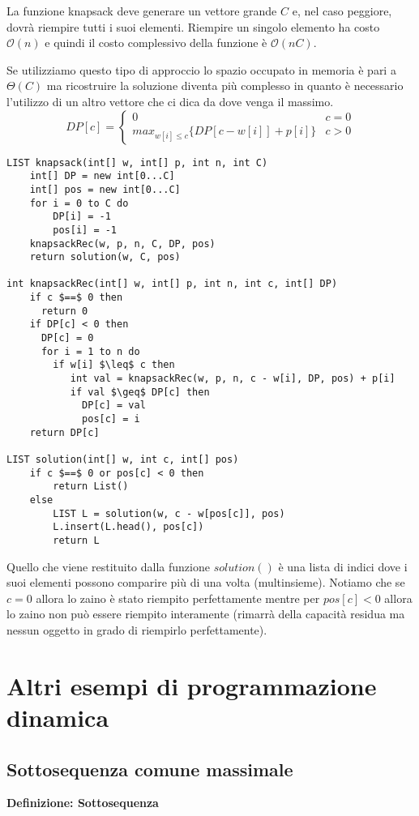 \documentclass[../cheatSheetAlgoritmi.tex]{subfiles}
\begin{document}
La funzione knapsack deve generare un vettore grande $C$ e, nel caso peggiore, dovrà riempire tutti i suoi elementi. Riempire un singolo elemento ha costo $\mathcal{O}(n)$ e quindi il costo complessivo della funzione è  $\mathcal{O}(nC)$.

\bigskip

Se utilizziamo questo tipo di approccio lo spazio occupato in memoria è pari a $\Theta(C)$ ma ricostruire la soluzione diventa più complesso in quanto è necessario l'utilizzo di un altro vettore che ci dica da dove venga il massimo.
\begin{equation*}
  	DP[c] =\begin{cases}
    	0 & \text{$c = 0$}\\
    	max_{w[i] \leq c}\{DP[c-w[i]]+p[i]\} & \text{$c>0$}
  	\end{cases}
\end{equation*}
\begin{lstlisting}[caption= Knapsack Ricostruzione Soluzione]
LIST knapsack(int[] w, int[] p, int n, int C)
	int[] DP = new int[0...C]
	int[] pos = new int[0...C]
	for i = 0 to C do
		DP[i] = -1
		pos[i] = -1
	knapsackRec(w, p, n, C, DP, pos)
	return solution(w, C, pos)
	
int knapsackRec(int[] w, int[] p, int n, int c, int[] DP)
	if c $==$ 0 then
	  return 0
	if DP[c] < 0 then
	  DP[c] = 0
	  for i = 1 to n do
	    if w[i] $\leq$ c then
	  	   int val = knapsackRec(w, p, n, c - w[i], DP, pos) + p[i]
	  	   if val $\geq$ DP[c] then
	   	     DP[c] = val
	   	     pos[c] = i
	return DP[c]
	
LIST solution(int[] w, int c, int[] pos)
	if c $==$ 0 or pos[c] < 0 then
		return List()
	else
		LIST L = solution(w, c - w[pos[c]], pos)
		L.insert(L.head(), pos[c])
		return L
\end{lstlisting}
Quello che viene restituito dalla funzione $solution()$ è una lista di indici dove i suoi elementi possono comparire più di una volta (multinsieme). Notiamo che se $c=0$ allora lo zaino è stato riempito perfettamente mentre per $pos[c]<0$ allora lo zaino non può essere riempito interamente (rimarrà della capacità residua ma nessun oggetto in grado di riempirlo perfettamente).
\newpage

\section{Altri esempi di programmazione dinamica} 
\subsection{Sottosequenza comune massimale}
\textbf{Definizione: Sottosequenza}
\end{document}
